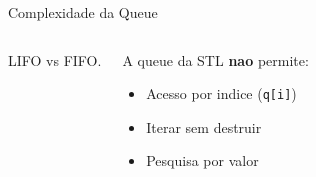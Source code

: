 \documentclass[aspectratio=169,11pt]{beamer}
\begin{document}
\begin{frame}{Complexidade da Queue}
\begin{columns}[c]
\begin{tcolorbox}[caixaAmarelo,title={Comparacao}]
        LIFO vs FIFO.
      \end{tcolorbox}
      \vspace{0.2cm}
      \begin{tcolorbox}[caixaVermelho,title={Cuidado}]
        \small
        A queue da STL \textbf{nao} permite:
        \begin{itemize}\footnotesize
          \item Acesso por indice (\texttt{q[i]})
          \item Iterar sem destruir
          \item Pesquisa por valor
        \end{itemize}
      \end{tcolorbox}
  \end{columns}
\end{frame}
\end{document}
